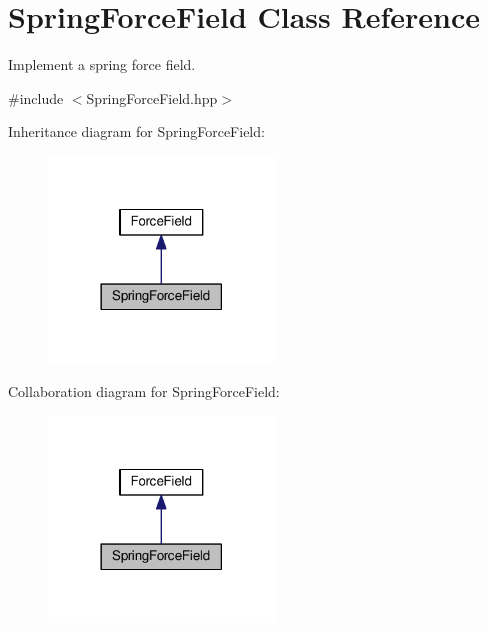 \hypertarget{classSpringForceField}{\section{Spring\+Force\+Field Class Reference}
\label{classSpringForceField}
}


Implement a spring force field.  




{\ttfamily \#include $<$Spring\+Force\+Field.\+hpp$>$}



Inheritance diagram for Spring\+Force\+Field\+:\nopagebreak
\begin{figure}[H]
\begin{center}
\leavevmode
\includegraphics[width=170pt]{classSpringForceField__inherit__graph}
\end{center}
\end{figure}


Collaboration diagram for Spring\+Force\+Field\+:\nopagebreak
\begin{figure}[H]
\begin{center}
\leavevmode
\includegraphics[width=170pt]{classSpringForceField__coll__graph}
\end{center}
\end{figure}
